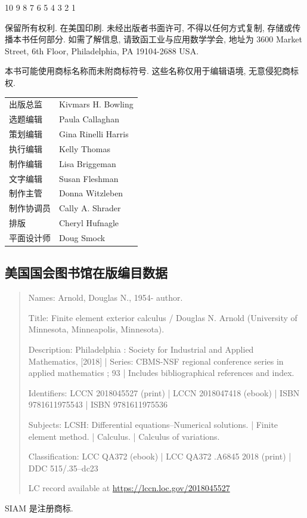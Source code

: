 10 9 8 7 6 5 4 3 2 1

{保留所有权利. 在美国印刷. 未经出版者书面许可, 不得以任何方式复制, 存储或传播本书任何部分. 如需了解信息, 请致函工业与应用数学学会, 地址为 3600 Market Street, 6th Floor, Philadelphia, PA 19104-2688 USA.}

{本书可能使用商标名称而未附商标符号. 这些名称仅用于编辑语境, 无意侵犯商标权.}

\begin{center}\begin{tabular}{ll}
{出版总监}&Kivmars H. Bowling\\
{选题编辑}&Paula Callaghan\\
{策划编辑}&Gina Rinelli Harris\\
{执行编辑}&Kelly Thomas\\
{制作编辑}&Lisa Briggeman\\
{文字编辑}&Susan Fleshman\\
{制作主管}&Donna Witzleben\\
{制作协调员}&Cally A. Shrader\\
{排版}&Cheryl Hufnagle\\
{平面设计师}&Doug Smock
\end{tabular}\end{center}

\subsection*{{美国国会图书馆在版编目数据}}
\begin{quote}\small
Names: Arnold, Douglas N., 1954- author.\par
Title: Finite element exterior calculus / Douglas N. Arnold (University of Minnesota, Minneapolis, Minnesota).\par
Description: Philadelphia : Society for Industrial and Applied Mathematics, [2018] | Series: CBMS-NSF regional conference series in applied mathematics ; 93 | Includes bibliographical references and index.\par
Identifiers: LCCN 2018045527 (print) | LCCN 2018047418 (ebook) | ISBN 9781611975543 | ISBN 9781611975536\par
Subjects: LCSH: Differential equations--Numerical solutions. | Finite element method. | Calculus. | Calculus of variations.\par
Classification: LCC QA372 (ebook) | LCC QA372 .A6845 2018 (print) | DDC 515/.35--dc23\par
LC record available at \url{https://lccn.loc.gov/2018045527}
\end{quote}

{SIAM 是注册商标.}
\clearpage
